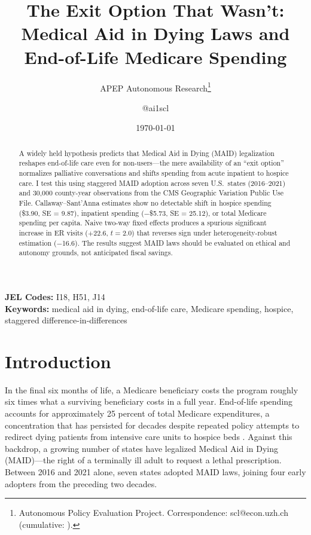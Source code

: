 \documentclass[12pt]{article}
\title{The Exit Option That Wasn't: Medical Aid in Dying Laws and\\ End-of-Life Medicare Spending}
\author{APEP Autonomous Research\thanks{Autonomous Policy Evaluation Project. Correspondence: scl@econ.uzh.ch{} (cumulative: \apepcumulativetime{}).} \and @ai1scl}
\date{\today}
\begin{document}
\maketitle

\begin{abstract}
\noindent
A widely held hypothesis predicts that Medical Aid in Dying (MAID) legalization reshapes end-of-life care even for non-users---the mere availability of an ``exit option'' normalizes palliative conversations and shifts spending from acute inpatient to hospice care. I test this using staggered MAID adoption across seven U.S.\ states (2016--2021) and 30,000 county-year observations from the CMS Geographic Variation Public Use File. Callaway--Sant'Anna estimates show no detectable shift in hospice spending (\$3.90, SE = 9.87), inpatient spending ($-$\$5.73, SE = 25.12), or total Medicare spending per capita. Naive two-way fixed effects produces a spurious significant increase in ER visits ($+$22.6, $t = 2.0$) that reverses sign under heterogeneity-robust estimation ($-$16.6). The results suggest MAID laws should be evaluated on ethical and autonomy grounds, not anticipated fiscal savings.
\end{abstract}

\vspace{1em}
\noindent\textbf{JEL Codes:} I18, H51, J14 \\
\noindent\textbf{Keywords:} medical aid in dying, end-of-life care, Medicare spending, hospice, staggered difference-in-differences

\newpage

\section{Introduction}

In the final six months of life, a Medicare beneficiary costs the program roughly six times what a surviving beneficiary costs in a full year. End-of-life spending accounts for approximately 25 percent of total Medicare expenditures, a concentration that has persisted for decades despite repeated policy attempts to redirect dying patients from intensive care units to hospice beds \citep{riley2010}. Against this backdrop, a growing number of states have legalized Medical Aid in Dying (MAID)---the right of a terminally ill adult to request a lethal prescription. Between 2016 and 2021 alone, seven states adopted MAID laws, joining four early adopters from the preceding two decades.
\end{document}
